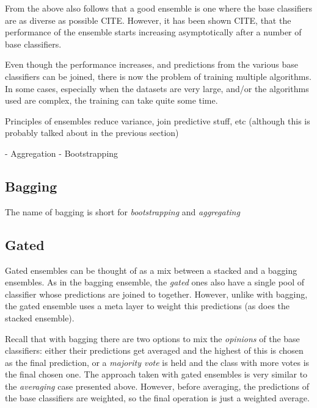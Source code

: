 \documentclass[epsfig,a4paper,11pt,titlepage,twoside,openany]{book}
\begin{document}
From the above also follows that a good ensemble is one where the base classifiers are as diverse as possible CITE. However, it has been shown CITE, that the performance of the ensemble starts increasing asymptotically after a number of base classifiers. 


Even though the performance increases, and predictions from the various base classifiers can be joined, there is now the problem of training multiple algorithms. In some cases, especially when the datasets are very large, and/or the algorithms used are complex, the training can take quite some time.



Principles of ensembles reduce variance, join predictive stuff, etc (although
this is probably talked about in the previous section)

- Aggregation - Bootstrapping
     
\subsection{Bagging}
\label{sec:ens-bagging}

The name of bagging is short for \textit{bootstrapping} and \textit{aggregating}

\cite{Breiman1996_bagging_predictors}


\subsection{Gated}
\label{sec:ens-gated}

Gated ensembles can be thought of as a mix between a stacked and a bagging ensembles. As in the bagging ensemble, the \textit{gated} ones also have a single pool of classifier whose predictions are joined to together. However, unlike with bagging, the gated ensemble uses a meta layer to weight this predictions (as does the stacked ensemble).

Recall that with bagging there are two options to mix the \textit{opinions} of the base classifiers: either their predictions get averaged and the highest of this is chosen as the final prediction, or a \textit{majority vote} is held and the class with more votes is the final chosen one. The approach taken with gated ensembles is very similar to the \textit{averaging} case presented above. However, before averaging, the predictions of the base classifiers are weighted, so the final operation is just a weighted average.
\end{document}
